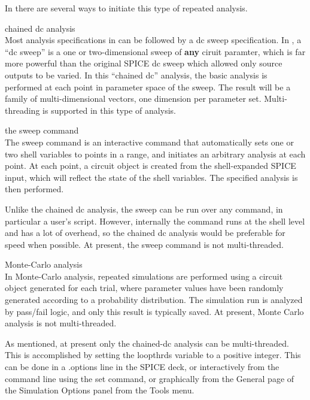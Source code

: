In {\WRspice} there are several ways to initiate this type of
repeated analysis.

\begin{description}
\item{chained dc analysis}\\
Most analysis specifications in {\WRspice} can be followed by a dc
sweep specification.  In {\WRspice}, a ``dc sweep'' is a one or
two-dimensional sweep of {\bf any} ciruit paramter, which is far more
powerful than the original SPICE dc sweep which allowed only source
outputs to be varied.  In this ``chained dc'' analysis, the basic
analysis is performed at each point in parameter space of the sweep. 
The result will be a family of multi-dimensional vectors, one
dimension per parameter set.  Multi-threading is supported in this
type of analysis.

\item{the {\cb sweep} command}\\
The {\cb sweep} command is an interactive command that automatically
sets one or two shell variables to points in a range, and initiates an
arbitrary analysis at each point.  At each point, a circuit object is
created from the shell-expanded SPICE input, which will reflect the
state of the shell variables.  The specified analysis is then
performed.

Unlike the chained dc analysis, the sweep can be run over any command,
in particular a user's script.  However, internally the command runs
at the shell level and has a lot of overhead, so the chained dc
analysis would be preferable for speed when possible.  At present, the
{\cb sweep} command is not multi-threaded.

\item{Monte-Carlo analysis}\\
In Monte-Carlo analysis, repeated simulations are performed using a
circuit object generated for each trial, where parameter values have
been randomly generated according to a probability distribution.  The
simulation run is analyzed by pass/fail logic, and only this result is
typically saved.  At present, Monte Carlo analysis is not
multi-threaded. 
\end{description}

As mentioned, at present only the chained-dc analysis can be
multi-threaded.  This is accomplished by setting the {\et loopthrds}
variable to a positive integer.  This can be done in a {\vt .options}
line in the SPICE deck, or interactively from the command line using
the {\cb set} command, or graphically from the {\cb General} page of
the {\cb Simulation Options} panel from the {\cb Tools} menu.

